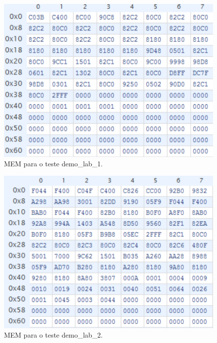 \documentclass[a4paper]{article}
\begin{document}
		\begin{figure}[h]
			\centering
			\includegraphics[width=1.\textwidth]{img/imem_1}
			\caption{MEM para o teste demo_lab_1.}
			\label{fig:imem_1}
		\end{figure}
		\begin{figure}[h]
			\centering
			\includegraphics[width=1.\textwidth]{img/imem_2}
			\caption{MEM para o teste demo_lab_2.}
			\label{fig:imem_2}
		\end{figure}
\end{document}
